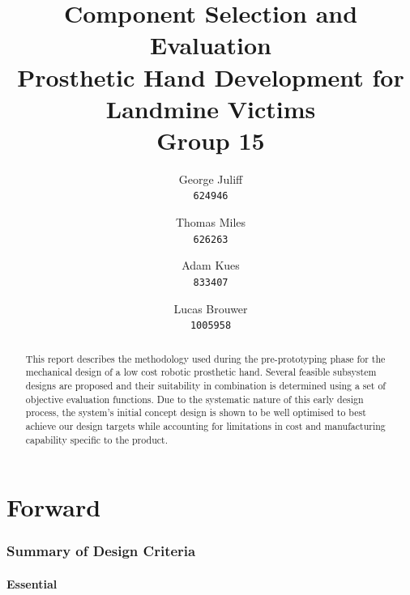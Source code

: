\documentclass[12pt,3p]{report}
\begin{document}
\pagestyle{fancy}
\lhead{}

\title{
	\huge Component Selection and Evaluation\\
	\small Prosthetic Hand Development for Landmine Victims \\
	\vspace{0.5cm}
	\vspace{1cm}
	\large Group 15
}

\author{
	George Juliff\\
	\texttt{624946}
	\and
	Thomas Miles\\
	\texttt{626263}
	\and
	Adam Kues\\
	\texttt{833407}
	\and
	Lucas Brouwer\\
	\texttt{1005958}
}


\maketitle
\vspace{2cm}

\begin{abstract}
This report describes the methodology used during the pre-prototyping phase for the mechanical design of a low cost robotic prosthetic hand. Several feasible subsystem designs are proposed and their suitability in combination is determined using a set of objective evaluation functions. Due to the systematic nature of this early design process, the system's initial concept design is shown to be well optimised to best achieve our design targets while accounting for limitations in cost and manufacturing capability specific to the product.
\end{abstract}

\pagebreak

\tableofcontents

\pagebreak


\part{Forward}
\section{Summary of Design Criteria}
	\subsection{Essential}	\label{ess}
	
\end{document}
